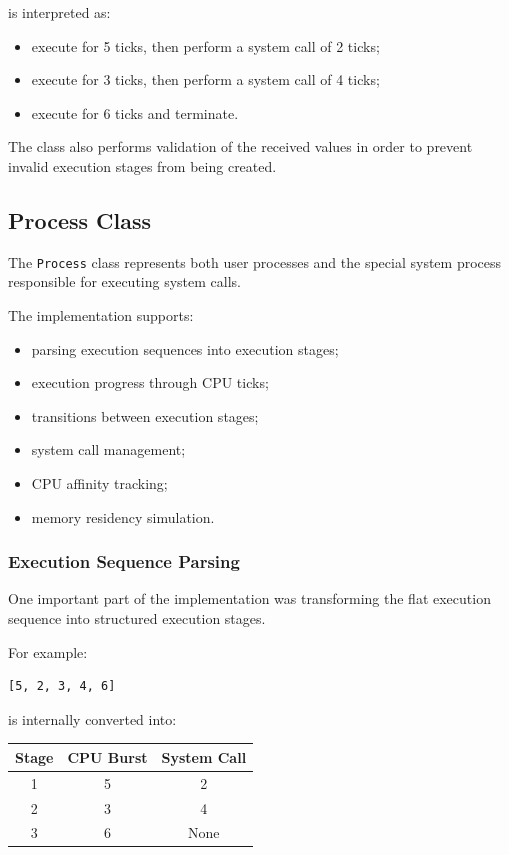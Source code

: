 \documentclass{article}
\begin{document}
is interpreted as:

\begin{itemize}
    \item execute for 5 ticks, then perform a system call of 2 ticks;
    \item execute for 3 ticks, then perform a system call of 4 ticks;
    \item execute for 6 ticks and terminate.
\end{itemize}

The class also performs validation of the received values in order to prevent invalid execution stages from being created.



\subsection{Process Class}

The \texttt{Process} class represents both user processes and the special system process responsible for executing system calls.

The implementation supports:

\begin{itemize}
    \item parsing execution sequences into execution stages;
    \item execution progress through CPU ticks;
    \item transitions between execution stages;
    \item system call management;
    \item CPU affinity tracking;
    \item memory residency simulation.
\end{itemize}

\subsubsection{Execution Sequence Parsing}

One important part of the implementation was transforming the flat execution sequence into structured execution stages.

For example:

\begin{verbatim}
[5, 2, 3, 4, 6]
\end{verbatim}

is internally converted into:

\begin{center}
\begin{tabular}{|c|c|c|}
\hline
Stage & CPU Burst & System Call \\
\hline
1 & 5 & 2 \\
2 & 3 & 4 \\
3 & 6 & None \\
\hline
\end{tabular}
\end{center}
\end{document}
